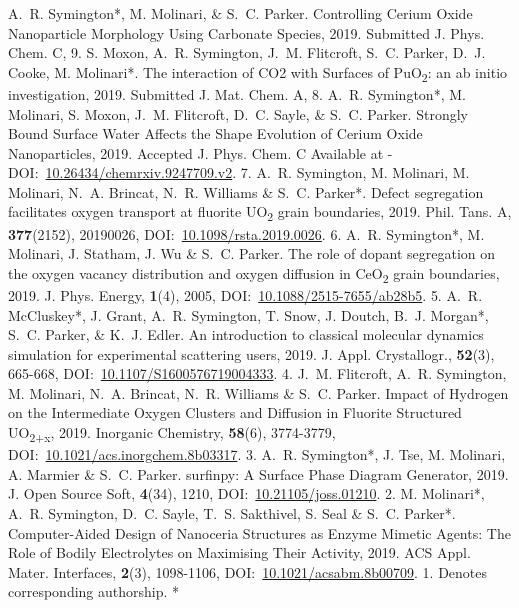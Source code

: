 \begin{cvpubys}
  \cvpuby
    {A.~R. Symington*, M. Molinari, \& S.~C. Parker.}
    {Controlling Cerium Oxide Nanoparticle Morphology Using Carbonate Species,}
    {2019.}
    {Submitted J. Phys. Chem. C,}
    {}
    {}
    {9.}
  \cvpuby
    {S. Moxon, A.~R. Symington, J.~M. Flitcroft, S.~C. Parker, D.~J. Cooke, M. Molinari*.}
    {The interaction of CO2 with Surfaces of PuO\textsubscript{2}: an ab initio investigation,}
    {2019.}
    {Submitted J. Mat. Chem. A,}
    {}
    {}
    {8.}
  \cvpuby
    {A.~R. Symington*, M. Molinari, S. Moxon, J.~M. Flitcroft, D.~C. Sayle, \& S.~C. Parker.}
    {Strongly Bound Surface Water Affects the Shape Evolution of Cerium Oxide Nanoparticles,}
    {2019.}
    {Accepted J. Phys. Chem. C}
    {}
    {Available at - DOI:~\href{https://doi.org/10.26434/chemrxiv.9247709.v2}{10.26434/chemrxiv.9247709.v2}.}    
    {7.}
  \cvpuby
    {A.~R. Symington, M. Molinari, M. Molinari, N.~A. Brincat, N.~R. Williams \& S.~C. Parker*.}
    {Defect segregation facilitates oxygen transport at fluorite UO\textsubscript{2} grain boundaries,}
    {2019.}
    {Phil. Tans. A,}
    {\textbf{377}(2152), 20190026,}
    {DOI:~\href{https://doi.org/10.1098/rsta.2019.0026}{10.1098/rsta.2019.0026}.}
    {6.}
  \cvpuby
    {A.~R. Symington*, M. Molinari, J. Statham, J. Wu \& S.~C. Parker.}
    {The role of dopant segregation on the oxygen vacancy distribution and oxygen diffusion in CeO\textsubscript{2} grain boundaries,}
    {2019.}
    {J. Phys. Energy,}
    {\textbf{1}(4), 2005,}
    {DOI:~\href{https://doi.org/10.1088/2515-7655/ab28b5}{10.1088/2515-7655/ab28b5}.}
    {5.}
  \cvpuby
    {A.~R. McCluskey*, J. Grant, A.~R. Symington, T. Snow, J. Doutch, B.~J. Morgan*, S.~C. Parker, \& K.~J. Edler.}
    {An introduction to classical molecular dynamics simulation for experimental scattering users,}
    {2019.}
    {J. Appl. Crystallogr.,}
    {\textbf{52}(3), 665-668,}
    {DOI:~\href{https://doi.org/10.1107/S1600576719004333}{10.1107/S1600576719004333}.}
    {4.}
  \cvpuby
    {J.~M. Flitcroft, A.~R. Symington, M. Molinari, N.~A. Brincat, N.~R. Williams \& S.~C. Parker.}
    {Impact of Hydrogen on the Intermediate Oxygen Clusters and Diffusion in Fluorite Structured UO\textsubscript{2+x},}
    {2019.}
    {Inorganic Chemistry,}
    {\textbf{58}(6), 3774-3779,}
    {DOI:~\href{https://doi.org/10.1021/acs.inorgchem.8b03317}{10.1021/acs.inorgchem.8b03317}.}
    {3.}
  \cvpuby
    {A.~R. Symington*, J. Tse, M. Molinari, A. Marmier \& S.~C. Parker.}
    {surfinpy: A Surface Phase Diagram Generator,}
    {2019.}
    {J. Open Source Soft,}
    {\textbf{4}(34), 1210,}
    {DOI:~\href{https://doi.org/10.21105/joss.01210}{10.21105/joss.01210}.}
    {2.}
  \cvpuby
    {M. Molinari*, A.~R. Symington, D.~C. Sayle, T.~S. Sakthivel, S. Seal \& S.~C. Parker*.}
    {Computer-Aided Design of Nanoceria Structures as Enzyme Mimetic Agents: The Role of Bodily Electrolytes on Maximising Their Activity,}
    {2019.}
    {‎ACS Appl. Mater. Interfaces,}
    {\textbf{2}(3), 1098-1106,}
    {DOI:~\href{https://doi.org/10.1021/acsabm.8b00709}{10.1021/acsabm.8b00709}.}
    {1.}
  \cvpuby
    {Denotes corresponding authorship.}
    {}
    {}
    {}
    {}
    {}
    {*}
\end{cvpubys}
